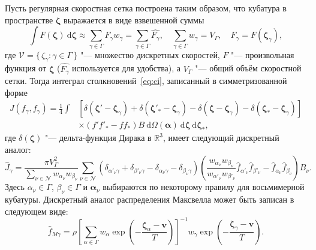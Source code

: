 \documentclass[a4paper,12pt]{article}
\newcommand{\dd}{\:\mathrm{d}}
\newcommand{\dzeta}{\boldsymbol{\dd\zeta}}
\newcommand{\bzeta}{\boldsymbol{\zeta}}
\newcommand{\Nu}{\mathcal{N}}
\newcommand{\Set}[2]{\{\,{#1}:{#2}\,\}}
\begin{document}
Пусть регулярная скоростная сетка построена таким образом,
что кубатура в пространстве \(\bzeta\) выражается в виде взвешенной суммы
\begin{equation}\label{eq:zeta_cubature}
    \int F(\bzeta) \dzeta \approx \sum_{\gamma\in\Gamma} F_\gamma w_\gamma =
        \sum_{\gamma\in\Gamma} \hat{F_\gamma},
        \quad \sum_{\gamma\in\Gamma} w_\gamma = V_\Gamma,
        \quad F_\gamma = F(\bzeta_\gamma),
\end{equation}
где \(\mathcal{V} = \Set{\zeta_\gamma}{\gamma\in\Gamma}\) "--- множество дискретных скоростей,
\(F\) "--- произвольная функция от \(\bzeta\) (\(\hat{F_\gamma}\) используется для удобства),
а \(V_\Gamma\) "--- общий объём скоростной сетки.
Тогда интеграл столкновений~\eqref{eq:ci}, записанный в симметризованной форме
\begin{equation}\label{eq:symm_ci}
    \begin{aligned}
    J(f_\gamma, f_\gamma) = \frac14\int &\left[
        \delta(\bzeta'-\bzeta_\gamma) + \delta(\bzeta'_*-\bzeta_\gamma)
        - \delta(\bzeta-\bzeta_\gamma) - \delta(\bzeta_*-\bzeta_\gamma)\right] \\
        &\times(f'f'_* - ff_*)B \dd\Omega(\boldsymbol{\alpha}) \dzeta\dzeta_*,
    \end{aligned}
\end{equation}
где \(\delta(\bzeta)\) "--- дельта-функция Дирака в \(\mathbb{R}^3\),
имеет следующий дискретный аналог:
\begin{equation}\label{eq:discrete_symm_ci}
    \hat{J}_\gamma = \frac{\pi V_\Gamma^2}{\sum_{\nu\in\Nu} w_{\alpha_\nu}w_{\beta_\nu}}
        \sum_{\nu\in\Nu} \left(
            \delta_{\alpha'_\nu\gamma} + \delta_{\beta'_\nu\gamma}
            - \delta_{\alpha_\nu\gamma} - \delta_{\beta_\nu\gamma}
        \right)\left(
            \frac{w_{\alpha_\nu}w_{\beta_\nu}}{w_{\alpha'_\nu}w_{\beta'_\nu}}
            \hat{f}_{\alpha'_\nu}\hat{f}_{\beta'_\nu} - \hat{f}_{\alpha_\nu}\hat{f}_{\beta_\nu}
        \right)B_\nu.
\end{equation}
Здесь \(\alpha_\nu\in\Gamma\), \(\beta_\nu\in\Gamma\) и \(\boldsymbol{\alpha}_\nu\)
выбираются по некоторому правилу для восьмимерной кубатуры.
Дискретный аналог распределения Максвелла может быть записан в следующем виде:
\begin{equation}\label{eq:discrete_Maxwell}
    \hat{f}_{M\gamma} = \rho\left[\sum_{\alpha\in\Gamma}w_\alpha\exp
            \left(-\frac{\bzeta_\alpha - \boldsymbol{v}}{T}\right)
        \right]^{-1}
        w_\gamma\exp\left(-\frac{\bzeta_\gamma - \boldsymbol{v}}{T}\right).
\end{equation}
\end{document}
